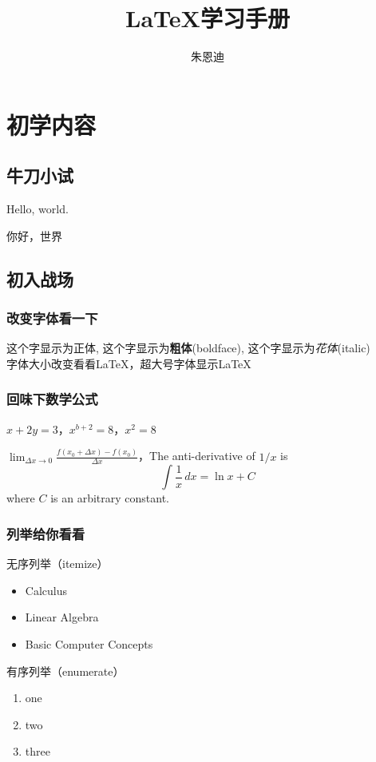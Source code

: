 \documentclass[12pt, a4paper,openany]{book}%
\title{\LaTeX{}学习手册}
\author{朱恩迪}
\date{}
\begin{document}
\maketitle
\tableofcontents %
\chapter{初学内容}
\section{牛刀小试}
Hello, world.						%

你好，世界

\section{初入战场}
\subsection{改变字体看一下}
这个字显示为正体,					%
这个字显示为{\bf 粗体}(boldface),
这个字显示为{\it 花体}(italic)\\
字体大小改变看看{\tiny\LaTeX{}}，超大号字体显示{\huge\LaTeX{}}

\subsection{回味下数学公式}
$x + 2y = 3$，$x^{b+2}=8$，$x^2=8$  %

$\lim_{\Delta x\to 0} \frac{f(x_0+\Delta x) - f(x_0)}{\Delta x}$，The anti-derivative of $1/x$ is $$ \int \frac{1}{x} \,dx = \ln x + C $$ where $C$ is an arbitrary constant.

\subsection{列举给你看看}
无序列举（itemize）
\begin{itemize}
\item Calculus
\item Linear Algebra
\item Basic Computer Concepts
\end{itemize}

有序列举（enumerate）
\begin{enumerate}
\item one
\item two
\item three
\end{enumerate}
\end{document}
